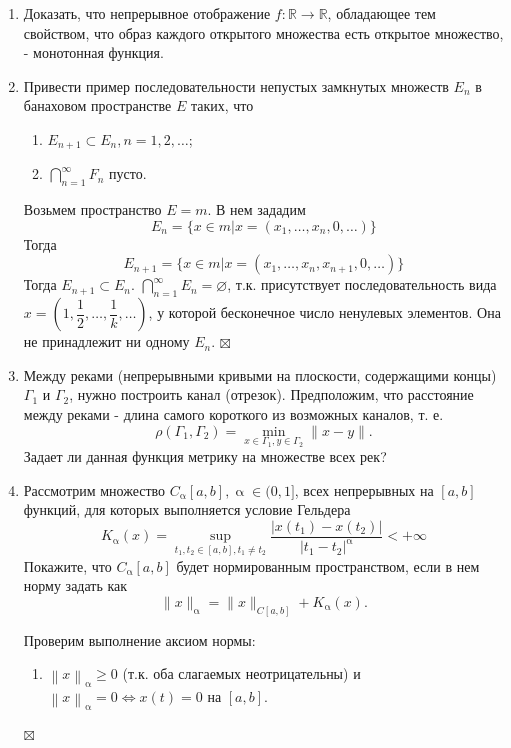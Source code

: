 \documentclass[a4paper, 12pt]{report}
\newenvironment{Proof} %
{\par\noindent{$\blacklozenge$}} %
{\hfill$\scriptstyle\boxtimes$}
\renewcommand{\geq}{\geqslant}
\renewcommand{\alpha}{\upalpha}
\newcommand\Norm[1]{\left\| #1 \right\|}
\begin{document}
\begin{enumerate}
\begin{itemize}
		\end{itemize}
		\item Доказать, что непрерывное отображение $f: \mathbb{R} \rightarrow \mathbb{R}$, обладающее тем свойством, что образ каждого открытого множества есть открытое множество, - монотонная функция.
		
		\item Привести пример последовательности непустых замкнутых множеств $E_{n}$ в банаховом пространстве $E$ таких, что
		\begin{enumerate}
		\item $E_{n+1} \subset E_{n}, n=1,2, \ldots$;
		\item $\bigcap_{n=1}^{\infty} F_{n}$ пусто.
		\end{enumerate}
		\begin{Proof}
			Возьмем пространство $E = m$. В нем зададим $$E_n = \{x \in m | x =(x_1,\ldots, x_n, 0,\ldots)\}$$
			Тогда  $$E_{n+1} = \{x \in m | x =(x_1,\ldots, x_n, x_{n+1},0,\ldots)\}$$
			Тогда $E_{n+1} \subset E_n$. $\bigcap_{n=1}^\infty E_n = \varnothing$, т.к. присутствует последовательность вида $x=(1, \dfrac{1}{2},\ldots, \dfrac{1}{k},\ldots)$, у которой бесконечное число ненулевых элементов. Она не принадлежит ни одному $E_n$. 
		\end{Proof}
		\item Между реками (непрерывными кривыми на плоскости, содержащими концы) $\Gamma_{1}$ и $\Gamma_{2}$, нужно построить канал (отрезок). Предположим, что расстояние между реками - длина самого короткого из возможных каналов, т. е.
		$$
		\rho\left(\Gamma_{1}, \Gamma_{2}\right)=\min _{x \in \Gamma_{1}, y \in \Gamma_{2}}\|x-y\| .
		$$
		Задает ли данная функция метрику на множестве всех рек?
		\item Рассмотрим множество $C_{\alpha}[a, b], \alpha \in(0,1]$, всех непрерывных на $[a, b]$ функций, для которых выполняется условие Гельдера
		$$
		K_{\alpha}(x)=\sup _{t_{1}, t_{2} \in[a, b], t_{1} \neq t_{2}} \frac{\left|x\left(t_{1}\right)-x\left(t_{2}\right)\right|}{\left|t_{1}-t_{2}\right|^{\alpha}}<+\infty
		$$
		Покажите, что $C_{\alpha}[a, b]$ будет нормированным пространством, если в нем норму задать как
		$$
		\|x\|_{\alpha}=\|x\|_{C[a, b]}+K_{\alpha}(x) .
		$$
		\begin{Proof}
			Проверим выполнение аксиом нормы:
			\begin{enumerate}
				\item $\Norm{x}_\alpha \geq 0$ (т.к. оба слагаемых неотрицательны) и $\Norm{x}_\alpha = 0 \Longleftrightarrow x(t) = 0$ на $[a,b]$.

\end{enumerate}
\end{Proof}
\end{enumerate}
\end{document}
